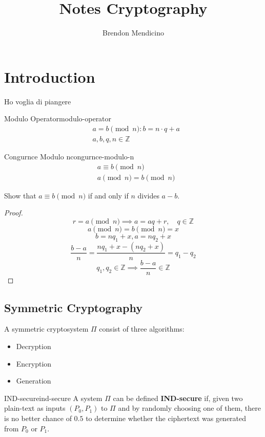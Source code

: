 \documentclass[12pt]{article}
\title{Notes Cryptography}
\author{Brendon Mendicino}
\begin{document}
\maketitle
\newpage
\tableofcontents
\newpage



\section{Introduction}
Ho voglia di piangere

\begin{definition}{Modulo Operator}{modulo-operator}
  \begin{align*}
    & a = b \pmod{n} : b = n \cdot q + a \\
    & a, b, q, n \in \mathbb{Z}
  \end{align*}
\end{definition}
\begin{definition}{Congurnce Modulo n}{congurnce-modulo-n}
  \begin{align*}
    & a \equiv b \pmod{n} \\
    & a \pmod{n} = b \pmod{n}
  \end{align*}
\end{definition}


\begin{example}{}{}
  Show that $ a \equiv b \pmod{n}$ if and only if $n$ divides $a - b$.
  \begin{proof}
    \[ r  = a \pmod{n} \implies a = aq + r, \quad q \in \mathbb{Z} \] 
    \[ a \pmod{n}  = b \pmod{n} = x \]
    \[ b  = nq_1 + x, a = nq_2 + x \]
    \[ \frac{b-a}{n}  = \frac{nq_1 + x - (nq_2 + x)}{n} = q_1 - q_2 \]
    \[ \boxed{ q_1, q_2  \in \mathbb{Z} \implies \frac{b-a}{n} \in \mathbb{Z} } \]
  \end{proof}
\end{example}

\subsection{Symmetric Cryptography}
A symmetric cryptosystem $\Pi$ consist of three algorithms:
\begin{itemize}
  \item Decryption
  \item Encryption
  \item Generation
\end{itemize}
\begin{definition}{IND-secure}{ind-secure}
  A system $\Pi$ can be defined \textbf{IND-secure} if, given two plain-text as inputs $(P_0, P_1)$ to $\Pi$ and by randomly choosing one of them, there is no better chance of $0.5$ to determine whether the ciphertext was generated from $P_0$ or $P_1$.
\end{definition}
\end{document}
